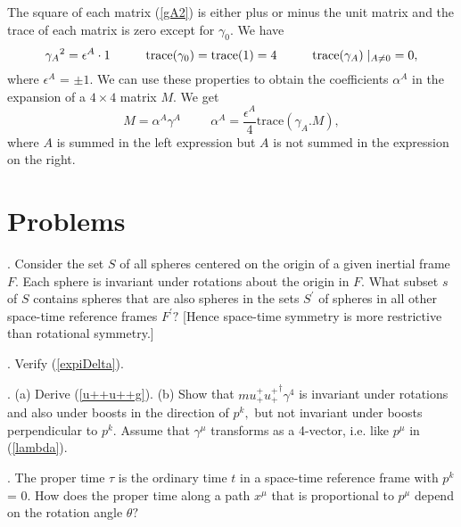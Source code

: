 \documentclass[a4paper,12pt]{article}
\begin{document}
	The square of each matrix (\ref{gA2}) is either plus or minus the unit matrix and the trace of each matrix is zero except for $\gamma_{0}.$ We have
\begin {equation} \label{gA3}
  {\gamma_{A}}^2 = \epsilon^{A} \cdot 1  \hspace{1cm} {\mathrm{trace }}(\gamma_{0}) = {\mathrm{trace }}(1) =4 \hspace{1cm} {\mathrm{trace }}(\gamma_{A}) \mid_{A \neq 0} \hspace{0.1cm}= 0 ,
\end{equation}
where $\epsilon^{A}$ = $\pm 1.$ We can use these properties to obtain the coefficients $\alpha^{A}$ in the expansion of a $4 \times 4$ matrix $M$. We get
\begin {equation} \label{M1}
  M = \alpha^{A}{\gamma^{A}}   \hspace{1cm} \alpha^{A} = \frac{\epsilon^{A}}{4} {\mathrm{trace }}(\gamma_{A}.M),
\end{equation}
where $A$ is summed in the left expression but $A$ is not summed in the expression on the right.

 \section{Problems} %

. Consider the set $S$ of all spheres centered on the origin of a given inertial frame $F.$ Each sphere is invariant under rotations about the origin in $F.$ What subset $s$ of $S$ contains spheres that are also spheres in the sets $S^{\prime}$ of spheres in all other space-time reference frames $F^{\prime}?$ [Hence space-time symmetry is more restrictive than rotational symmetry.]

\vspace{0.3cm}
. Verify (\ref{expiDelta}).

\vspace{0.3cm}
. (a) Derive (\ref{u++u++g}). (b) Show that $m u_{+}^{+} {u_{+}^{+  }}^{\dagger} \gamma^{4}$ is invariant under rotations and also under boosts in the direction of $p^{k},$ but not invariant under boosts perpendicular to $p^{k}.$ Assume that $\gamma^{\mu}$ transforms as a 4-vector, i.e. like $p^{\mu}$ in (\ref{lambda}).

\vspace{0.3cm}
. The proper time $\tau$ is the ordinary time $t$ in a space-time reference frame with $p^{k}$ = 0. How does the proper time along a path $x^{\mu}$ that is proportional to $p^{\mu}$ depend on the rotation angle $\theta?$
\end{document}
